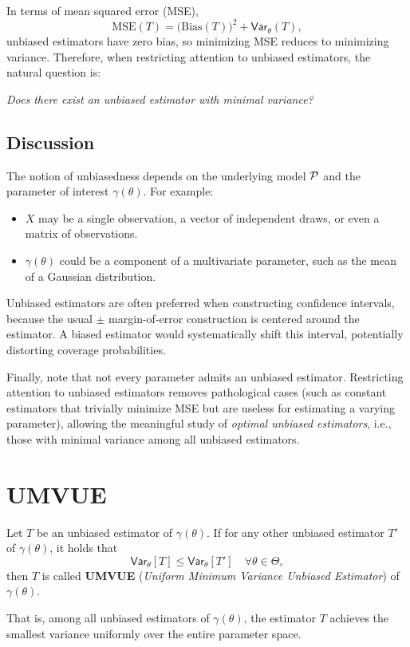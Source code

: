 In terms of mean squared error (MSE),
\[
\text{MSE}(T) = \bigl(\text{Bias}(T)\bigr)^2 + \mathsf{Var}_\theta(T),
\]
unbiased estimators have zero bias, so minimizing MSE reduces to minimizing variance. Therefore, when restricting attention to unbiased estimators, the natural question is:

\emph{Does there exist an unbiased estimator with minimal variance?}

\subsection*{Discussion}
The notion of unbiasedness depends on the underlying model \(\mathcal{P}\) and the parameter of interest \(\gamma(\theta)\). For example:
\begin{itemize}
    \item \(X\) may be a single observation, a vector of independent draws, or even a matrix of observations.
    \item \(\gamma(\theta)\) could be a component of a multivariate parameter, such as the mean of a Gaussian distribution.
\end{itemize}

Unbiased estimators are often preferred when constructing confidence intervals, because the usual $\pm$ margin-of-error construction is centered around the estimator. A biased estimator would systematically shift this interval, potentially distorting coverage probabilities.

Finally, note that not every parameter admits an unbiased estimator. 
Restricting attention to unbiased estimators removes pathological cases (such as constant estimators that trivially minimize MSE but are useless for estimating a varying parameter), allowing the meaningful study of \emph{optimal unbiased estimators}, i.e., those with minimal variance among all unbiased estimators.


\section{UMVUE}%
\label{sec:UMVUE}
\begin{definition}[]
    Let \(T\) be an unbiased estimator of \(\gamma(\theta)\). If for any other unbiased estimator \(T'\) of \(\gamma(\theta)\), it holds that 
    \[
        \mathsf{Var}_{\theta}[T] \le \mathsf{Var}_{\theta}[T']\quad \forall \theta \in \Theta,
    \]
    then \(T\) is called \textbf{UMVUE} (\emph{Uniform Minimum Variance Unbiased Estimator}) of \(\gamma(\theta)\).

That is, among all unbiased estimators of \( \gamma(\theta) \), the estimator \( T \) achieves the
smallest variance uniformly over the entire parameter space.
\end{definition}

